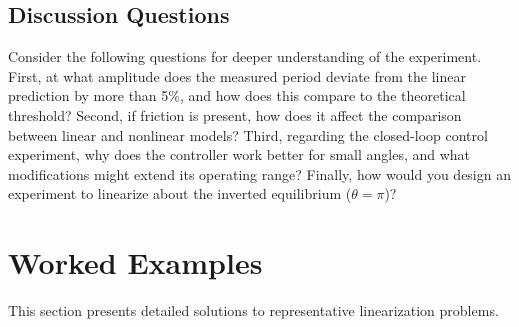 \subsection{Discussion Questions}

Consider the following questions for deeper understanding of the experiment. First, at what amplitude does the measured period deviate from the linear prediction by more than 5\%, and how does this compare to the theoretical threshold? Second, if friction is present, how does it affect the comparison between linear and nonlinear models? Third, regarding the closed-loop control experiment, why does the controller work better for small angles, and what modifications might extend its operating range? Finally, how would you design an experiment to linearize about the inverted equilibrium ($\theta = \pi$)?

\section{Worked Examples}
\label{sec:linearization_examples}

This section presents detailed solutions to representative linearization problems.

